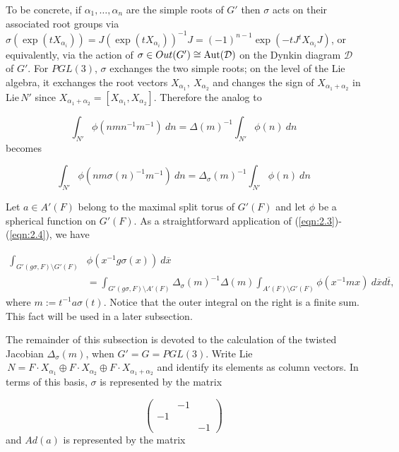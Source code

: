 \documentclass[12pt,letterpaper]{amsart}
\numberwithin{equation}{section}
\theoremstyle{definition}
\theoremstyle{plain}
\providecommand{\cal}{\mathcal}
\def\ddd{{\cal D}}
\def\ovx{\overline{x}}
\def\ovt{\overline{t}}
\begin{document}
To be concrete, if $\alpha_1,\dots,\alpha_n$ are the simple roots of $G'$ then
$\sigma$ acts on their associated root groups via
$\sigma (\exp (tX_{\alpha_i})) = J(\exp (tX_{\alpha_i}))^{-1}J
= (-1)^{n-1}\exp (-tJ{^{t}X}_{\alpha_i}J)$,
or equivalently, via the action of $\sigma \in Out(G')\cong
{\rm Aut}(\ddd )$ on the Dynkin diagram $\ddd $ of $G'$. 
For $PGL(3)$, $\sigma$ exchanges the two simple roots; on the level of the
Lie algebra, it exchanges the root vectors $X_{\alpha_1},
\ X_{\alpha_2}$ and changes the sign of $X_{\alpha_1+\alpha_2}$
in Lie$\,N'$ since $X_{\alpha_1+\alpha_2}=[X_{\alpha_1},X_{\alpha_2}]$.
Therefore the analog to

\begin{equation}
\label{eqn:2.3}
\int_{N'} \phi (nmn^{-1}m^{-1})\ dn
= \Delta (m)^{-1}\int_{N'} \phi (n)\ dn 
\end{equation}
becomes

\begin{equation}
\label{eqn:2.4}
\int_{N'} \phi (nm\sigma (n)^{-1}m^{-1})\ dn
= \Delta_{\sigma}(m)^{-1}\int_{N'} \phi (n)\ dn 
\end{equation}
 
Let $a\in A'(F)$
belong to the maximal split torus of $G'(F)$ and let $\phi$ be a spherical
function on $G'(F)$. As a straightforward application of 
(\ref{eqn:2.3})-(\ref{eqn:2.4}), we
have

\begin{equation}
\label{eqn:2.5}
\begin{split}
\int_{G'(g\sigma ,F)\setminus G'(F)}
&\phi (x^{-1}g\sigma (x))\ d\ovx\\
&=\int_{G'(g\sigma ,F)\setminus A'(F)}\Delta_{\sigma}(m)^{-1}\Delta (m)
\int_{A'(F)\setminus G'(F)} \phi (x^{-1}mx)\ d\ovx d\ovt ,
\end{split}
\end{equation}
where $m:=t^{-1}a\sigma (t)$. Notice that the outer integral on the
right is a finite sum. This fact will be used in a later subsection.
 
The remainder of this subsection is devoted to the calculation of the
twisted Jacobian $\Delta_{\sigma}(m)$, when $G' = G = PGL(3)$. Write
Lie$\,N = F\cdot X_{\alpha_1}\oplus F\cdot X_{\alpha_2}
\oplus F\cdot X_{\alpha_1+\alpha_2}$ and identify its elements as
column vectors. In terms of this basis, $\sigma$ is represented by
the matrix

\[
\left( 
\begin{array}{ccc} 
\ &-1&\ \\
-1&\ &\ \\
\ &\ &-1
\end{array} 
\right)
\]
and $Ad(a)$ is represented by the matrix
\end{document}
